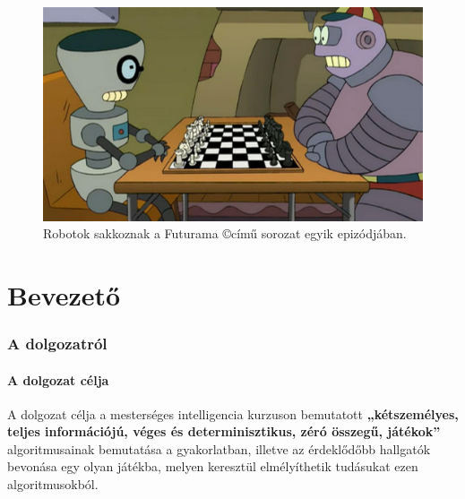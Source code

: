\documentclass[twoside, a4paper, 12pt]{article}
\title{\THESISTITLE}
\author{\THESISAUTHOR}
\date{\THESISDEFENCEYEAR}
\begin{document}
\pagestyle{empty}


\cleardoublepage

\null
\vspace*{\fill}
\begin{figure}[htbp]
	\centering
	\includegraphics[width=1.0\textwidth]{img/bots_chess.png}
	\caption{Robotok sakkoznak a Futurama \copyright című sorozat egyik epizódjában.}
	\label{fig:bots_chess}
\end{figure}
\vspace*{\fill}
\null
\cleardoublepage

\tableofcontents
\cleardoublepage


\pagestyle{plain}
\setcounter{page}{1}

\newpage


\part{Bevezető}
\section{A dolgozatról}
\subsection{A dolgozat célja}
A dolgozat célja a mesterséges intelligencia kurzuson bemutatott \textbf{„kétszemélyes, teljes információjú, véges és determinisztikus, zéró összegű, játékok”} algoritmusainak bemutatása a gyakorlatban, illetve az érdeklődőbb hallgatók bevonása egy olyan játékba, melyen keresztül elmélyíthetik tudásukat ezen algoritmusokból.
\end{document}
